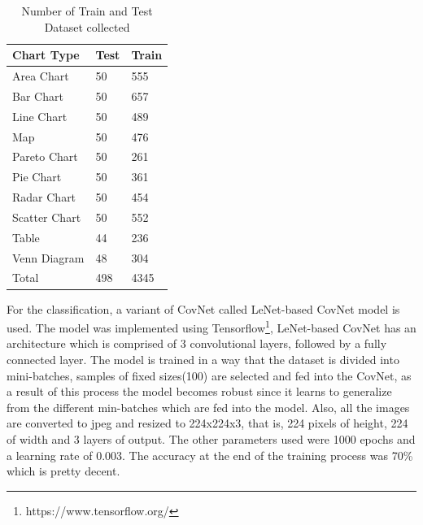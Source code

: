 \documentclass[12pt, a4paper,oneside]{report}
\begin{document}
\begin{table}[h]
	\centering {} \small
	\begin{tabular}{|p{5cm}|p{3cm}|p{3cm}|}
		\hline
		Chart Type & Test & Train \\ \hline
		Area Chart & 50 & 555 \\ \hline
		Bar Chart & 50 & 657 \\ \hline
		Line Chart & 50 & 489 \\ \hline
		Map & 50 & 476 \\ \hline
		Pareto Chart & 50 & 261 \\ \hline	
		Pie Chart & 50 & 361 \\ \hline
		Radar Chart & 50 & 454 \\ \hline
		Scatter Chart & 50 & 552 \\ \hline
		Table & 44 & 236 \\ \hline
		Venn Diagram & 48 & 304 \\ \hline
		Total & 498 & 4345 \\ \hline
		
	\end{tabular}
	\caption {Number of Train and Test Dataset collected}	
	\label{table:rela}
\end{table}

For the classification, a variant of CovNet called LeNet-based CovNet model is used. The model was implemented using Tensorflow\footnote{https://www.tensorflow.org/}, LeNet-based CovNet has an architecture which is comprised of 3 convolutional layers, followed by a fully connected layer. The model is trained in a way that the dataset is divided into mini-batches, samples of fixed sizes(100) are selected and fed into the CovNet, as a result of this process the model becomes robust since it learns to generalize from the different min-batches which are fed into the model. Also, all the images are converted to jpeg and resized to 224x224x3, that is, 224 pixels of height, 224 of width and 3 layers of output. The other parameters used were 1000 epochs and a learning rate of 0.003. The accuracy at the end of the training process was 70\% which is pretty decent.
\end{document}

